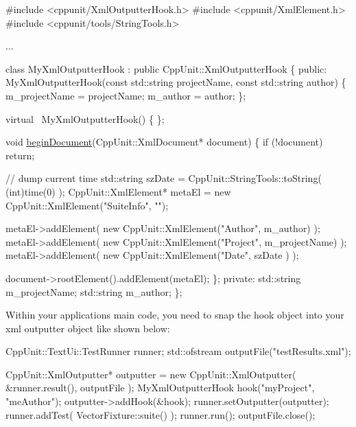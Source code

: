 \begin{DoxyCode}
\textcolor{preprocessor}{#include <cppunit/XmlOutputterHook.h>}
\textcolor{preprocessor}{#include <cppunit/XmlElement.h>}
\textcolor{preprocessor}{#include <cppunit/tools/StringTools.h>}

...

class MyXmlOutputterHook : \textcolor{keyword}{public} CppUnit::XmlOutputterHook
\{
\textcolor{keyword}{public}:
  MyXmlOutputterHook(\textcolor{keyword}{const} std::string projectName,
                     \textcolor{keyword}{const} std::string author)
  \{
     m\_projectName = projectName;
     m\_author      = author;
  \};

  \textcolor{keyword}{virtual} ~MyXmlOutputterHook()
  \{
  \};

  \textcolor{keywordtype}{void} \hyperlink{class_xml_outputter_hook_a1d2b5d5d0fc42d273d6430522a70ccbb}{beginDocument}(CppUnit::XmlDocument* document)
  \{
    \textcolor{keywordflow}{if} (!document)
      \textcolor{keywordflow}{return};

    \textcolor{comment}{// dump current time}
    std::string szDate          = CppUnit::StringTools::toString( (\textcolor{keywordtype}{int})time(0) );
    CppUnit::XmlElement* metaEl = \textcolor{keyword}{new} CppUnit::XmlElement(\textcolor{stringliteral}{"SuiteInfo"}, 
                                                          \textcolor{stringliteral}{""});

    metaEl->addElement( \textcolor{keyword}{new} CppUnit::XmlElement(\textcolor{stringliteral}{"Author"}, m\_author) );
    metaEl->addElement( \textcolor{keyword}{new} CppUnit::XmlElement(\textcolor{stringliteral}{"Project"}, m\_projectName) );
    metaEl->addElement( \textcolor{keyword}{new} CppUnit::XmlElement(\textcolor{stringliteral}{"Date"}, szDate ) );
   
    document->rootElement().addElement(metaEl);
  \};
\textcolor{keyword}{private}:
  std::string m\_projectName;
  std::string m\_author;
\}; 
\end{DoxyCode}


Within your application\textquotesingle{}s main code, you need to snap the hook object into your xml outputter object like shown below\+:


\begin{DoxyCode}
CppUnit::TextUi::TestRunner runner;
std::ofstream outputFile(\textcolor{stringliteral}{"testResults.xml"});

CppUnit::XmlOutputter* outputter = \textcolor{keyword}{new} CppUnit::XmlOutputter( &runner.result(),
                                                              outputFile );    
MyXmlOutputterHook hook(\textcolor{stringliteral}{"myProject"}, \textcolor{stringliteral}{"meAuthor"});
outputter->addHook(&hook);
runner.setOutputter(outputter);    
runner.addTest( VectorFixture::suite() );   
runner.run();
outputFile.close();
\end{DoxyCode}


